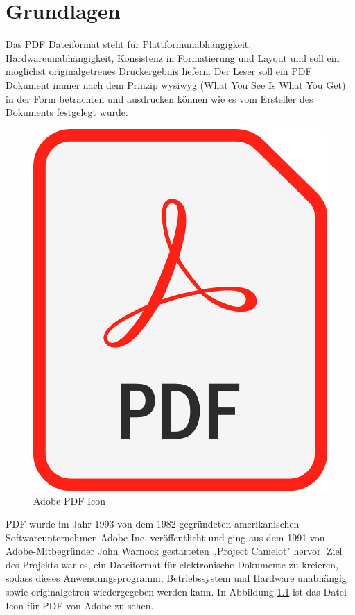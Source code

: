 \chapter{Grundlagen}
Das PDF Dateiformat steht für Plattformunabhängigkeit, Hardwareunabhängigkeit, Konsistenz in Formatierung und Layout und soll ein möglichst originalgetreues Druckergebnis liefern. Der Leser soll ein PDF Dokument immer nach dem Prinzip \gls{wysiwyg} (What You See Is What You Get) in der Form betrachten und ausdrucken können wie es vom Ersteller des Dokuments festgelegt wurde.
\par
\begin{figure}[!htbp]
	\centering
	\includegraphics[scale=0.1]{"images/PDFfileIcon.png"}
	\caption{Adobe PDF Icon \cite{wiki-pdf-engl}}
	\label{fig:icon}
\end{figure}
PDF wurde im Jahr 1993 von dem 1982 gegründeten amerikanischen Softwareunternehmen Adobe Inc. veröffentlicht und ging aus dem 1991 von Adobe-Mitbegründer John Warnock gestarteten „Project Camelot" hervor\cite{wiki-pdf-de}. Ziel des Projekts war es, ein Dateiformat für elektronische Dokumente zu kreieren, sodass dieses Anwendungsprogramm, Betriebssystem und Hardware unabhängig sowie originalgetreu wiedergegeben werden kann. In Abbildung \ref{fig:icon} ist das Datei-Icon für PDF von Adobe zu sehen. \\
